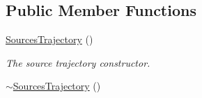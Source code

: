 \subsection*{Public Member Functions}
\begin{DoxyCompactItemize}
\item 
\hyperlink{class_hoa2_d_1_1_sources_trajectory_a8d96898f30c4fb18957847e3ddd3e407}{Sources\-Trajectory} ()
\begin{DoxyCompactList}\small\item\em The source trajectory constructor. \end{DoxyCompactList}\item 
\hypertarget{class_hoa2_d_1_1_sources_trajectory_a7b2452c54b5991fe6c1cbcf7fe999a87}{\hyperlink{class_hoa2_d_1_1_sources_trajectory_a7b2452c54b5991fe6c1cbcf7fe999a87}{$\sim$\-Sources\-Trajectory} ()}\label{class_hoa2_d_1_1_sources_trajectory_a7b2452c54b5991fe6c1cbcf7fe999a87}


\end{DoxyCompactItemize}

